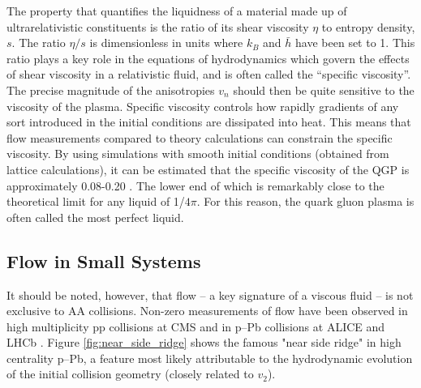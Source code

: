   The property that quantifies the liquidness of a material made up of ultrarelativistic constituents is the ratio of its shear viscosity $\eta$ to entropy density, $s$. The ratio $\eta/s$ is dimensionless in units where $k_B$ and $\bar{h}$ have been set to 1. This ratio plays a key role in the equations of hydrodynamics which govern the effects of shear viscosity in a relativistic fluid, and is often called the ``specific viscosity''. The precise magnitude of the anisotropies $v_n$ should then be quite sensitive to the viscosity of the plasma. Specific viscosity controls how rapidly gradients of any sort introduced in the initial conditions are dissipated into heat. This means that flow measurements compared to theory calculations can constrain the specific viscosity. By using simulations with smooth initial conditions (obtained from lattice calculations),  it can be estimated that the specific viscosity of the QGP is approximately 0.08-0.20 \cite{Romatschke2007}. The lower end of which is remarkably close to the theoretical limit for any liquid of 1/$4\pi$. For this reason, the quark gluon plasma is often called the most perfect liquid.




\subsection{Flow in Small Systems}
It should be noted, however, that flow -- a key signature of a viscous fluid -- is not exclusive to AA collisions. Non-zero measurements of flow have been observed in high multiplicity pp collisions at CMS \cite{Khachatryan2010} and in p--Pb collisions at ALICE and LHCb \cite{Abelev2013,Aaij2016} . Figure \ref{fig:near_side_ridge} shows the famous "near side ridge" in high centrality p--Pb, a feature most likely attributable to the hydrodynamic evolution of the initial collision geometry (closely related to $v_2$).

